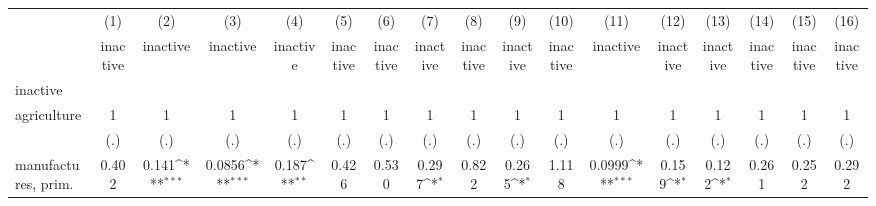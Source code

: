 {
\def\sym#1{\ifmmode^{#1}\else\(^{#1}\)\fi}
\begin{tabular}{l*{16}{c}}
\hline\hline
                    &\multicolumn{1}{c}{(1)}&\multicolumn{1}{c}{(2)}&\multicolumn{1}{c}{(3)}&\multicolumn{1}{c}{(4)}&\multicolumn{1}{c}{(5)}&\multicolumn{1}{c}{(6)}&\multicolumn{1}{c}{(7)}&\multicolumn{1}{c}{(8)}&\multicolumn{1}{c}{(9)}&\multicolumn{1}{c}{(10)}&\multicolumn{1}{c}{(11)}&\multicolumn{1}{c}{(12)}&\multicolumn{1}{c}{(13)}&\multicolumn{1}{c}{(14)}&\multicolumn{1}{c}{(15)}&\multicolumn{1}{c}{(16)}\\
                    &\multicolumn{1}{c}{inactive}&\multicolumn{1}{c}{inactive}&\multicolumn{1}{c}{inactive}&\multicolumn{1}{c}{inactive}&\multicolumn{1}{c}{inactive}&\multicolumn{1}{c}{inactive}&\multicolumn{1}{c}{inactive}&\multicolumn{1}{c}{inactive}&\multicolumn{1}{c}{inactive}&\multicolumn{1}{c}{inactive}&\multicolumn{1}{c}{inactive}&\multicolumn{1}{c}{inactive}&\multicolumn{1}{c}{inactive}&\multicolumn{1}{c}{inactive}&\multicolumn{1}{c}{inactive}&\multicolumn{1}{c}{inactive}\\
\hline
inactive            &                     &                     &                     &                     &                     &                     &                     &                     &                     &                     &                     &                     &                     &                     &                     &                     \\
agriculture         &           1         &           1         &           1         &           1         &           1         &           1         &           1         &           1         &           1         &           1         &           1         &           1         &           1         &           1         &           1         &           1         \\
                    &         (.)         &         (.)         &         (.)         &         (.)         &         (.)         &         (.)         &         (.)         &         (.)         &         (.)         &         (.)         &         (.)         &         (.)         &         (.)         &         (.)         &         (.)         &         (.)         \\
[1em]
manufactures, prim. &       0.402         &       0.141\sym{***}&      0.0856\sym{***}&       0.187\sym{**} &       0.426         &       0.530         &       0.297\sym{*}  &       0.822         &       0.265\sym{*}  &       1.118         &      0.0999\sym{***}&       0.159\sym{*}  &       0.122\sym{*}  &       0.261         &       0.252         &       0.292         \\

\end{tabular}}
